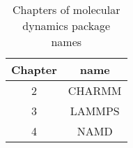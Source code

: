 \begin{table}[h!]
\begin{center}
\caption{Chapters of molecular dynamics package names}
\begin{tabular}{|c|c|}
\hline
Chapter  & name    \\ \hline
2        &  CHARMM \\ 
3        &  LAMMPS \\ 
4        &  NAMD   \\ \hline
\end{tabular}
\label{Tab:Tcr}
\end{center}
\end{table}